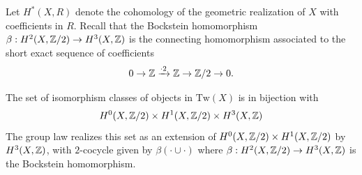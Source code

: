 \documentclass[12pt]{article}
\begin{document}
Let $H^*(X, R)$ denote the cohomology of the geometric realization of $X$ with coefficients in $R$. Recall that the Bockstein homomorphism $\beta:H^2(X,\mathbb{Z}/2)\to H^3(X,\mathbb{Z})$ is the connecting homomorphism associated to the short exact sequence of coefficients
\[0\to \mathbb{Z} \xrightarrow{\cdot 2} \mathbb{Z} \to \mathbb{Z}/2 \to 0.\]
\begin{proposition}
    The set of isomorphism classes of objects in $\mathrm{Tw}(X)$ is in bijection with \[H^0(X,\mathbb{Z}/2)\times H^1(X,\mathbb{Z}/2)\times H^3(X,\mathbb{Z})\] The group law realizes this set as an extension of $H^0(X,\mathbb{Z}/2)\times H^1(X,\mathbb{Z}/2)$ by $H^3(X,\mathbb{Z})$, with $2$-cocycle given by $\beta(\cdot \cup \cdot)$ where $\beta:H^2(X,\mathbb{Z}/2)\to H^3(X,\mathbb{Z})$ is the Bockstein homomorphism.
\end{proposition}
\end{document}
